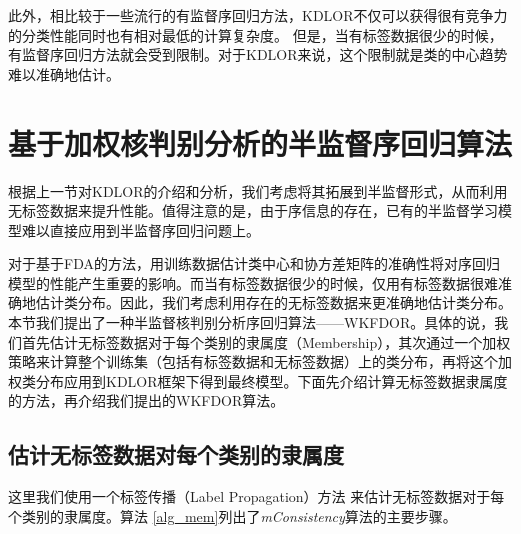 此外，相比较于一些流行的有监督序回归方法，KDLOR不仅可以获得很有竞争力的分类性能同时也有相对最低的计算复杂度\citep{sun2010kernel}。
但是，当有标签数据很少的时候，有监督序回归方法就会受到限制。对于KDLOR来说，这个限制就是类的中心趋势难以准确地估计。

\section{基于加权核判别分析的半监督序回归算法}

根据上一节对KDLOR的介绍和分析，我们考虑将其拓展到半监督形式，从而利用无标签数据来提升性能。值得注意的是，由于序信息的存在，已有的半监督学习模型难以直接应用到半监督序回归问题上。

对于基于FDA的方法，用训练数据估计类中心和协方差矩阵的准确性将对序回归模型的性能产生重要的影响。而当有标签数据很少的时候，仅用有标签数据很难准确地估计类分布。因此，我们考虑利用存在的无标签数据来更准确地估计类分布。本节我们提出了一种半监督核判别分析序回归算法——WKFDOR。具体的说，我们首先估计无标签数据对于每个类别的隶属度（Membership），其次通过一个加权策略来计算整个训练集（包括有标签数据和无标签数据）上的类分布，再将这个加权类分布应用到KDLOR框架下得到最终模型。下面先介绍计算无标签数据隶属度的方法，再介绍我们提出的WKFDOR算法。

\subsection{估计无标签数据对每个类别的隶属度}
这里我们使用一个标签传播（Label Propagation）方法\citep{zhou2004learning}
来估计无标签数据对于每个类别的隶属度。算法 \ref{alg_mem}列出了\textit{mConsistency}算法的主要步骤。

